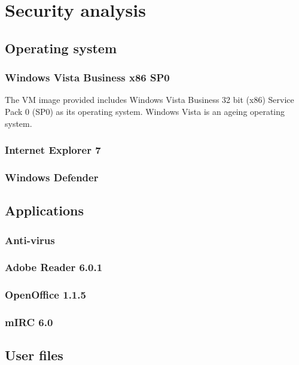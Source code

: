 \section{Security analysis}

\subsection{Operating system}

\subsubsection{Windows Vista Business x86 SP0}

The VM image provided includes Windows Vista Business 32 bit (x86) Service Pack 0 (SP0) as its operating system. Windows Vista is an ageing operating system. 

\subsubsection{Internet Explorer 7}

\subsubsection{Windows Defender}

\subsection{Applications}

\subsubsection{Anti-virus}

\subsubsection{Adobe Reader 6.0.1}

\subsubsection{OpenOffice 1.1.5}

\subsubsection{mIRC 6.0}

\subsection{User files}